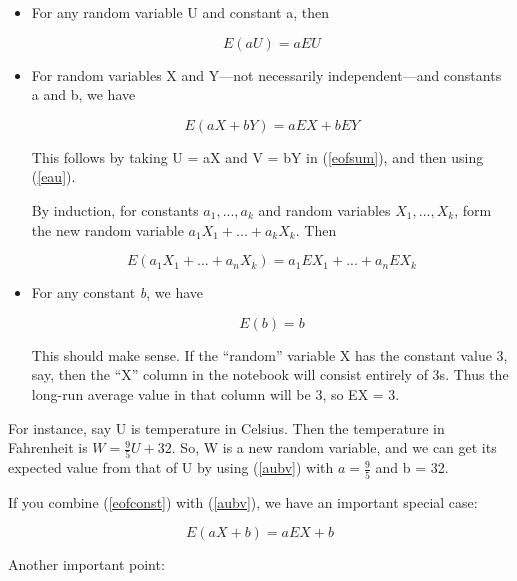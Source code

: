 \begin{itemize}

\item For any random variable U and constant a, then

\begin{equation}
\label{eau}
E(aU) = a EU
\end{equation}

\item For random variables X and Y---not necessarily independent---and
constants a and b, we have

\begin{equation}
\label{aubv}
E(aX+bY) = a EX + b EY
\end{equation}

This follows by taking U = aX and V = bY in (\ref{eofsum}), and then
using (\ref{eau}).

By induction, for constants $a_1,...,a_k$ and random variables
$X_1,...,X_k$, form the new random variable 
$a_1 X_1 +...+ a_k X_k$.  Then

\begin{equation}
\label{elincomb}
E(a_1 X_1 +...+ a_n X_k) = 
a_1 EX_1 +...+ a_n EX_k
\end{equation}

\item For any constant {\it b}, we have

\begin{equation}
\label{eofconst}
E(b) = b
\end{equation}

This should make sense.  If the ``random'' variable X has the constant
value 3, say, then the ``X'' column in the notebook will consist
entirely of 3s.  Thus the long-run average value in that column will be
3, so EX = 3.

\end{itemize}

For instance, say U is temperature in Celsius.  Then the temperature in
Fahrenheit is $W = \frac{9}{5} U + 32$.  So, W is a new random variable,
and we can get its expected value from that of U by using (\ref{aubv})
with $a = \frac{9}{5}$ and b = 32.

If you combine (\ref{eofconst}) with (\ref{aubv}), we have an important
special case:

\begin{equation}
\label{aub}
E(aX+b) = a EX + b
\end{equation}

Another important point:

